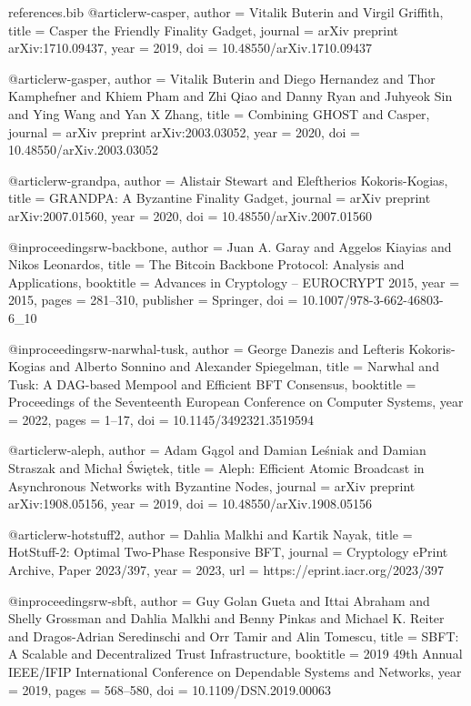 \begin{filecontents*}{references.bib}
@article{rw-casper,
  author = {Vitalik Buterin and Virgil Griffith},
  title = {Casper the Friendly Finality Gadget},
  journal = {arXiv preprint arXiv:1710.09437},
  year = {2019},
  doi = {10.48550/arXiv.1710.09437}
}

@article{rw-gasper,
  author = {Vitalik Buterin and Diego Hernandez and Thor Kamphefner and Khiem Pham and Zhi Qiao and Danny Ryan and Juhyeok Sin and Ying Wang and Yan X Zhang},
  title = {Combining {GHOST} and Casper},
  journal = {arXiv preprint arXiv:2003.03052},
  year = {2020},
  doi = {10.48550/arXiv.2003.03052}
}

@article{rw-grandpa,
  author = {Alistair Stewart and Eleftherios Kokoris-Kogias},
  title = {{GRANDPA}: A Byzantine Finality Gadget},
  journal = {arXiv preprint arXiv:2007.01560},
  year = {2020},
  doi = {10.48550/arXiv.2007.01560}
}

@inproceedings{rw-backbone,
  author = {Juan A. Garay and Aggelos Kiayias and Nikos Leonardos},
  title = {The Bitcoin Backbone Protocol: Analysis and Applications},
  booktitle = {Advances in Cryptology -- EUROCRYPT 2015},
  year = {2015},
  pages = {281--310},
  publisher = {Springer},
  doi = {10.1007/978-3-662-46803-6_10}
}

@inproceedings{rw-narwhal-tusk,
  author = {George Danezis and Lefteris Kokoris-Kogias and Alberto Sonnino and Alexander Spiegelman},
  title = {Narwhal and Tusk: A {DAG}-based Mempool and Efficient {BFT} Consensus},
  booktitle = {Proceedings of the Seventeenth European Conference on Computer Systems},
  year = {2022},
  pages = {1--17},
  doi = {10.1145/3492321.3519594}
}

@article{rw-aleph,
  author = {Adam Gągol and Damian Leśniak and Damian Straszak and Michał Świętek},
  title = {Aleph: Efficient Atomic Broadcast in Asynchronous Networks with Byzantine Nodes},
  journal = {arXiv preprint arXiv:1908.05156},
  year = {2019},
  doi = {10.48550/arXiv.1908.05156}
}

@article{rw-hotstuff2,
  author = {Dahlia Malkhi and Kartik Nayak},
  title = {{HotStuff-2}: Optimal Two-Phase Responsive {BFT}},
  journal = {Cryptology ePrint Archive, Paper 2023/397},
  year = {2023},
  url = {https://eprint.iacr.org/2023/397}
}

@inproceedings{rw-sbft,
  author = {Guy Golan Gueta and Ittai Abraham and Shelly Grossman and Dahlia Malkhi and Benny Pinkas and Michael K. Reiter and Dragos-Adrian Seredinschi and Orr Tamir and Alin Tomescu},
  title = {{SBFT}: A Scalable and Decentralized Trust Infrastructure},
  booktitle = {2019 49th Annual IEEE/IFIP International Conference on Dependable Systems and Networks},
  year = {2019},
  pages = {568--580},
  doi = {10.1109/DSN.2019.00063}
}


\end{filecontents*}

